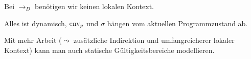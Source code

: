\begin{remark}
    Bei $\to_D$ benötigen wir keinen lokalen Kontext.

    Alles ist dynamisch, \dh{} $\operatorname{env}_p$ und $\sigma$ hängen vom aktuellen Programmzustand ab.

    Mit mehr Arbeit ($\leadsto$ zusätzliche Indirektion und umfangreicherer lokaler Kontext) kann man auch statische Gültigkeitsbereiche modellieren.
\end{remark}
